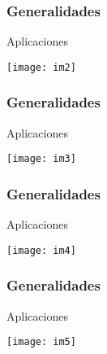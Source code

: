 \documentclass[spanish]{beamer}
\begin{document}
\begin{frame}
\frametitle{Generalidades} 
Aplicaciones 
\begin{center}
\texttt{[image: im2]}
\end{center}
\end{frame}
\begin{frame}
\frametitle{Generalidades} 
Aplicaciones 

\begin{center}
\texttt{[image: im3]}
\end{center}
\end{frame}
\begin{frame}
\frametitle{Generalidades} 
Aplicaciones 
\begin{center}
\texttt{[image: im4]}
\end{center}
\end{frame}
\begin{frame}
\frametitle{Generalidades} 
Aplicaciones 
\begin{center}
\texttt{[image: im5]}
\end{center}
\end{frame}
\end{document}
